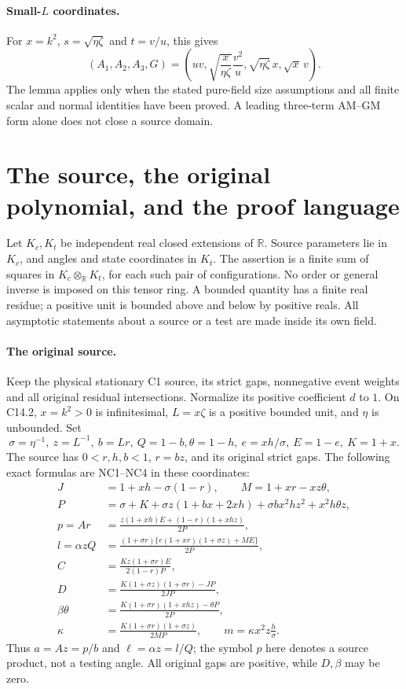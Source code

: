 \paragraph{Small-$L$ coordinates.}
For $x=k^2$, $s=\sqrt{\eta\zeta}$ and $t=v/u$, this gives
\[
 (A_1,A_2,A_3,G)=
 \left(uv,\sqrt{\frac{x}{\eta\zeta}}\frac{v^2}{u},
       \sqrt{\eta\zeta}\,x,\sqrt{x}\,v\right).
\]
The lemma applies only when the stated pure-field size assumptions and
all finite scalar and normal identities have been proved. A leading
three-term AM--GM form alone does not close a source domain.


\section{\texorpdfstring{The source, the original polynomial, and the proof language}{The source, the original polynomial, and the proof language}}
\label{component:p472f434581f3}


Let $K_c,K_t$ be independent real closed extensions of $\mathbb R$.
Source parameters lie in $K_c$, and angles and state coordinates in
$K_t$. The assertion is a finite sum of squares in
$K_c\otimes_{\mathbb R}K_t$, for each such pair of configurations.
No order or general inverse is imposed on this tensor ring.
A bounded quantity has a finite real residue; a positive unit is
bounded above and below by positive reals. All asymptotic statements
about a source or a test are made inside its own field.

\paragraph{The original source.}
Keep the physical stationary C1 source, its strict gaps,
nonnegative event weights and all original residual intersections.
Normalize its positive coefficient $d$ to $1$. On C14.2,
$x=k^2>0$ is infinitesimal, $L=x\zeta$ is a positive bounded unit,
and $\eta$ is unbounded. Set
\[
 \sigma=\eta^{-1},\ z=L^{-1},\ b=Lr,\ Q=1-b,
 \theta=1-h,\ e=xh/\sigma,\ E=1-e,\ K=1+x.
\]
The source has $0<r,h,b<1$, $r=bz$, and its original strict gaps.
The following exact formulas are NC1--NC4 in these coordinates:
\[
\begin{split}
 J&=1+xh-\sigma(1-r),\qquad M=1+xr-xz\theta,\\
 P&=\sigma+K+\sigma z(1+bx+2xh)
                  +\sigma bx^2hz^2+x^2h\theta z,\\
 p=Ar&=\frac{z(1+xh)E+(1-r)(1+xhz)}{2P},\\
 l=\alpha zQ&=\frac{(1+\sigma r)
     \{e(1+xr)(1+\sigma z)+ME\}}{2P},\\
 C&=\frac{Kz(1+\sigma r)E}{2(1-r)P},\\
 D&=\frac{K(1+\sigma z)(1+\sigma r)-JP}{2JP},\\
 \beta\theta&=\frac{K(1+\sigma r)(1+xhz)-\theta P}{2P},\\
 \kappa&=\frac{K(1+\sigma r)(1+\sigma z)}{2MP},
 \qquad m=\kappa x^2z\frac h\sigma.
\end{split}                                                     \tag{P1}
\]
Thus $a=Az=p/b$ and $\ell=\alpha z=l/Q$; the symbol $p$ here
denotes a source product, not a testing angle. All original gaps
are positive, while $D,\beta$ may be zero.

